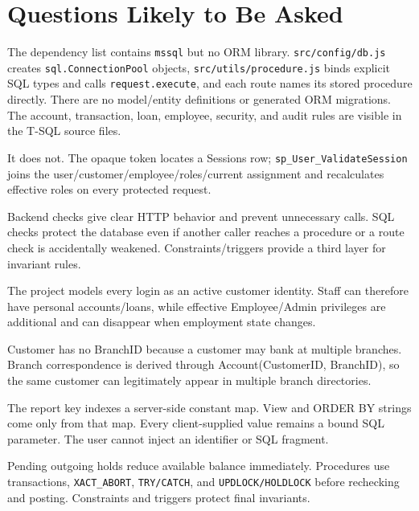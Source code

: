 \documentclass[11pt,a4paper,oneside]{report}
\newcommand{\codepath}[1]{\nolinkurl{#1}}
\begin{document}
\chapter{Questions Likely to Be Asked}
\begin{defensebox}
The dependency list contains \texttt{mssql} but no ORM library. \codepath{src/config/db.js} creates \texttt{sql.ConnectionPool} objects, \codepath{src/utils/procedure.js} binds explicit SQL types and calls \texttt{request.execute}, and each route names its stored procedure directly. There are no model/entity definitions or generated ORM migrations. The account, transaction, loan, employee, security, and audit rules are visible in the T-SQL source files.
\end{defensebox}
\begin{defensebox}
It does not. The opaque token locates a Sessions row; \texttt{sp\_User\_ValidateSession} joins the user/customer/employee/roles/current assignment and recalculates effective roles on every protected request.
\end{defensebox}
\begin{defensebox}
Backend checks give clear HTTP behavior and prevent unnecessary calls. SQL checks protect the database even if another caller reaches a procedure or a route check is accidentally weakened. Constraints/triggers provide a third layer for invariant rules.
\end{defensebox}
\begin{defensebox}
The project models every login as an active customer identity. Staff can therefore have personal accounts/loans, while effective Employee/Admin privileges are additional and can disappear when employment state changes.
\end{defensebox}
\begin{defensebox}
Customer has no BranchID because a customer may bank at multiple branches. Branch correspondence is derived through Account(CustomerID, BranchID), so the same customer can legitimately appear in multiple branch directories.
\end{defensebox}
\begin{defensebox}
The report key indexes a server-side constant map. View and ORDER BY strings come only from that map. Every client-supplied value remains a bound SQL parameter. The user cannot inject an identifier or SQL fragment.
\end{defensebox}
\begin{defensebox}
Pending outgoing holds reduce available balance immediately. Procedures use transactions, \texttt{XACT\_ABORT}, \texttt{TRY/CATCH}, and \texttt{UPDLOCK/HOLDLOCK} before rechecking and posting. Constraints and triggers protect final invariants.
\end{defensebox}
\end{document}
